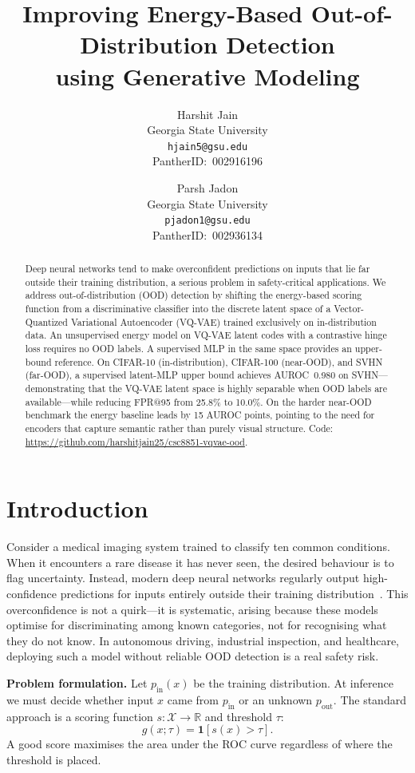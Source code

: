 \documentclass[10pt,twocolumn,letterpaper]{article}
\title{Improving Energy-Based Out-of-Distribution Detection\\
       using Generative Modeling}
\author{Harshit Jain\\
  Georgia State University\\
  {\tt\small hjain5@gsu.edu}\\
  {\small PantherID:~002916196}
  \and
  Parsh Jadon\\
  Georgia State University\\
  {\tt\small pjadon1@gsu.edu}\\
  {\small PantherID:~002936134}
}
\begin{document}
\maketitle

\begin{abstract}
Deep neural networks tend to make overconfident predictions
on inputs that lie far outside their training distribution,
a serious problem in safety-critical applications.
We address out-of-distribution (OOD) detection by shifting
the energy-based scoring function from a discriminative
classifier into the discrete latent space of a
Vector-Quantized Variational Autoencoder (VQ-VAE) trained
exclusively on in-distribution data.
An unsupervised energy model on VQ-VAE latent codes with a
contrastive hinge loss requires no OOD labels.
A supervised MLP in the same space provides an upper-bound
reference.
On CIFAR-10 (in-distribution), CIFAR-100 (near-OOD), and
SVHN (far-OOD), a supervised latent-MLP upper bound
achieves AUROC~0.980 on SVHN---demonstrating that the
VQ-VAE latent space is highly separable when OOD labels
are available---while reducing FPR@95 from 25.8\% to
10.0\%.
On the harder near-OOD benchmark the energy baseline leads
by 15 AUROC points, pointing to the need for encoders that
capture semantic rather than purely visual structure.
Code: \url{https://github.com/harshitjain25/csc8851-vqvae-ood}.
\end{abstract}

\section{Introduction}

Consider a medical imaging system trained to classify ten
common conditions.
When it encounters a rare disease it has never seen, the
desired behaviour is to flag uncertainty.
Instead, modern deep neural networks regularly output
high-confidence predictions for inputs entirely outside
their training distribution~\cite{nguyen2015}.
This overconfidence is not a quirk---it is systematic,
arising because these models optimise for discriminating
among known categories, not for recognising what they do not
know.
In autonomous driving, industrial inspection, and
healthcare, deploying such a model without reliable OOD
detection is a real safety risk.

\textbf{Problem formulation.}
Let $p_{\mathrm{in}}(x)$ be the training distribution.
At inference we must decide whether input $x$ came from
$p_{\mathrm{in}}$ or an unknown $p_{\mathrm{out}}$.
The standard approach is a scoring function
$s:\mathcal{X}\!\to\!\mathbb{R}$ and threshold $\tau$:
\begin{equation}
  g(x;\tau) = \mathbf{1}[s(x)>\tau].   \label{eq:decision}
\end{equation}
A good score maximises the area under the ROC curve
regardless of where the threshold is placed.
\end{document}
